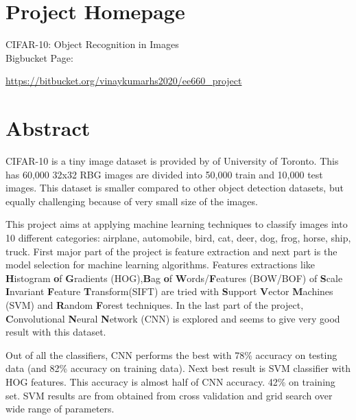 \documentclass[12pt]{article}
\begin{document}



\tableofcontents

\section{Project Homepage}
CIFAR-10: Object Recognition in Images\\
Bigbucket Page: 

\url{https://bitbucket.org/vinaykumarhs2020/ee660\_project}



\section{Abstract}
CIFAR-10 is a tiny image dataset is provided by \citet{ref:dataset} of University of Toronto. This has 60,000 32x32 RBG images are divided into 50,000 train and 10,000 test images. This dataset is smaller compared to other object detection datasets, but equally challenging because of very small size of the images.

This project aims at applying machine learning techniques to classify images into 10 different categories: airplane, automobile, bird, cat, deer, dog, frog, horse, ship, truck. First major part of the project is feature extraction and next part is the model selection for machine learning algorithms. Features extractions like \textbf{H}istogram \textbf{o}f \textbf{G}radients (HOG),\textbf{B}ag \textbf{o}f \textbf{W}ords/\textbf{F}eatures  (BOW/BOF) of \textbf{S}cale \textbf{I}nvariant \textbf{F}eature \textbf{T}ransform(SIFT) are tried with \textbf{S}upport \textbf{V}ector \textbf{M}achines (SVM) and \textbf{R}andom \textbf{F}orest techniques. In the last part of the project, \textbf{C}onvolutional \textbf{N}eural \textbf{N}etwork (CNN) is explored and seems to give very good result with this dataset.

Out of all the classifiers, CNN performs the best with 78\% accuracy on testing data (and 82\% accuracy on training data). Next best result is SVM classifier with HOG features. This accuracy is almost half of CNN accuracy. 42\% on training set. SVM results are from obtained from cross validation and grid search over wide range of parameters. 
\end{document}
